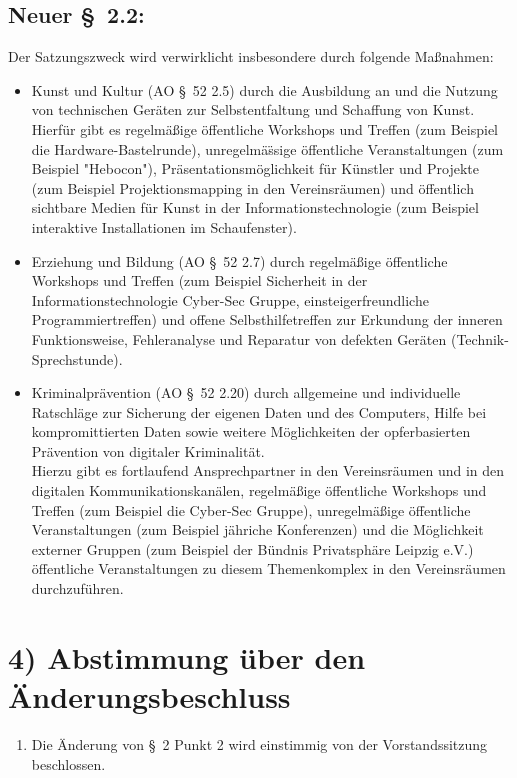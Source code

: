 \documentclass[10pt,a4paper]{scrartcl}
\newcommand{\qs}[1]{\glqq#1\grqq}
\begin{document}
\subsection*{Neuer \S\ 2.2:}
	Der Satzungszweck wird verwirklicht insbesondere durch folgende Ma{\ss}nahmen:
	\begin{itemize}
		\item	Kunst und Kultur (AO \S\ 52 2.5) durch die Ausbildung an und die Nutzung von technischen Ger{\"a}ten zur
				Selbstentfaltung und Schaffung von Kunst. Hierf{\"u}r gibt es regelm{\"a}{\ss}ige {\"o}ffentliche Workshops und Treffen
				(zum Beispiel die \qs{Hardware-Bastelrunde}), unregelm{\"a}{\"ss}ige {\"o}ffentliche Veranstaltungen (zum Beispiel
				"Hebocon"), Pr{\"a}sentationsm{\"o}glichkeit f{\"u}r K{\"u}nstler und Projekte (zum Beispiel \qs{Projektionsmapping}
				in den Vereinsr{\"a}umen) und {\"o}ffentlich sichtbare Medien f{\"u}r Kunst in der Informationstechnologie
				(zum Beispiel interaktive Installationen im Schaufenster).
		\item	Erziehung und Bildung (AO \S\ 52 2.7) durch regelm{\"a}{\ss}ige {\"o}ffentliche Workshops und Treffen (zum Beispiel
				Sicherheit in der Informationstechnologie \qs{Cyber-Sec Gruppe}, einsteigerfreundliche Programmiertreffen)
				und offene Selbsthilfetreffen zur Erkundung der inneren Funktionsweise, Fehleranalyse und Reparatur von
				defekten Ger{\"a}ten (\qs{Technik-Sprechstunde}).
		\item	Kriminalpr{\"a}vention (AO \S\ 52 2.20) durch allgemeine und individuelle Ratschl{\"a}ge zur Sicherung der eigenen
				Daten und des Computers, Hilfe bei kompromittierten Daten sowie weitere M{\"o}glichkeiten der
				opferbasierten Pr{\"a}vention von digitaler Kriminalit{\"a}t.\\
				Hierzu gibt es fortlaufend Ansprechpartner in den Vereinsr{\"a}umen und in den digitalen Kommunikationskan{\"a}len,
				regelm{\"a}{\ss}ige {\"o}ffentliche Workshops und Treffen (zum Beispiel die \qs{Cyber-Sec Gruppe}), unregelm{\"a}{\ss}ige
				{\"o}ffentliche Veranstaltungen (zum Beispiel j{\"a}hriche Konferenzen) und die M{\"o}glichkeit externer Gruppen
				(zum Beispiel der B{\"u}ndnis Privatsph{\"a}re Leipzig e.V.) {\"o}ffentliche Veranstaltungen zu diesem Themenkomplex
				in den Vereinsr{\"a}umen durchzuf{\"u}hren.
	\end{itemize}
\section*{4) Abstimmung {\"u}ber den {\"A}nderungsbeschluss}
    \begin{enumerate}
        \item Die {\"A}nderung von \S\ 2 Punkt 2 wird einstimmig von der Vorstandssitzung beschlossen.\\
    \end{enumerate}
\end{document}
